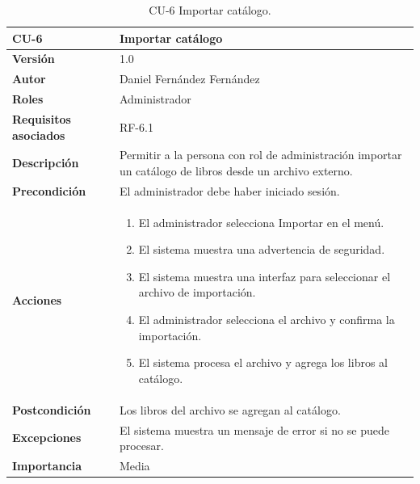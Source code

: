 \begin{table}[p]
        \centering
        \begin{tabularx}{\linewidth}{ p{} p{} }
            \toprule
            \textbf{CU-6} & \textbf{Importar catálogo}\\
            \toprule
            \textbf{Versión} & 1.0 \\
            \textbf{Autor} & Daniel Fernández Fernández \\
            \textbf{Roles} & Administrador \\
            \textbf{Requisitos asociados} & RF-6.1 \\
            \textbf{Descripción} & Permitir a la persona con rol de administración importar un catálogo de libros desde un archivo externo. \\
            \textbf{Precondición} & El administrador debe haber iniciado sesión. \\
            \textbf{Acciones} &
            \begin{enumerate}
            \def\labelenumi{\arabic{enumi}.}
            \tightlist
            \item El administrador selecciona Importar en el menú.
            \item El sistema muestra una advertencia de seguridad.
            \item El sistema muestra una interfaz para seleccionar el archivo de importación.
            \item El administrador selecciona el archivo y confirma la importación.
            \item El sistema procesa el archivo y agrega los libros al catálogo.
            \end{enumerate}\\
            \textbf{Postcondición} & Los libros del archivo se agregan al catálogo. \\
            \textbf{Excepciones} & El sistema muestra un mensaje de error si no se puede procesar. \\
            \textbf{Importancia} & Media \\
            \bottomrule
        \end{tabularx}
        \caption{CU-6 Importar catálogo.}
\end{table}

